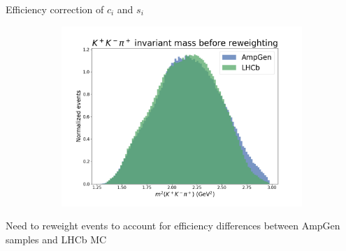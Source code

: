 \documentclass{beamer}
\begin{document}
\begin{frame}{Efficiency correction of $c_i$ and $s_i$}
\begin{figure}
\begin{subfigure}{0.33\textwidth}
      \includegraphics[width = 1.0\textwidth]{Plots/s012_BeforeReweighting.png}
    \end{subfigure}
  \end{figure}
  \begin{center}
    Need to reweight events to account for efficiency differences between AmpGen samples and LHCb MC
  \end{center}
\end{frame}  
\end{document}
